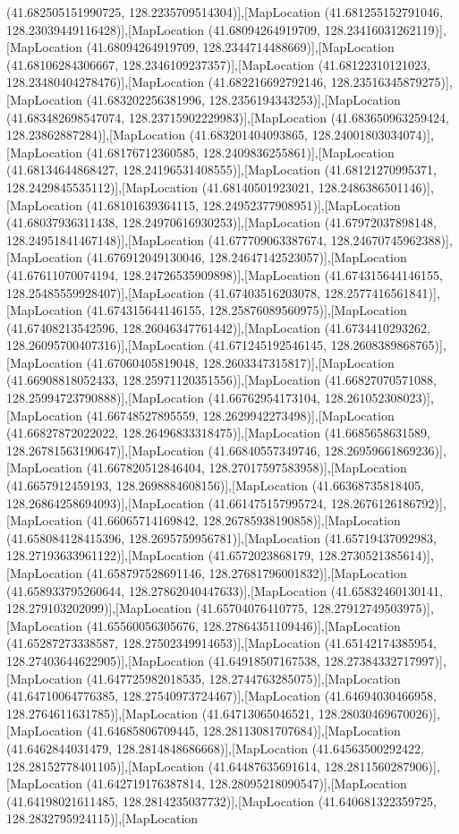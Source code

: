 (41.682505151990725, 128.2235709514304)],[MapLocation (41.681255152791046, 128.23039449116428)],[MapLocation (41.68094264919709, 128.23416031262119)],[MapLocation (41.68094264919709, 128.2344714488669)],[MapLocation (41.68106284306667, 128.2346109237357)],[MapLocation (41.68122310121023, 128.23480404278476)],[MapLocation (41.682216692792146, 128.23516345879275)],[MapLocation (41.683202256381996, 128.2356194343253)],[MapLocation (41.683482698547074, 128.23715902229983)],[MapLocation (41.683650963259424, 128.23862887284)],[MapLocation (41.683201404093865, 128.24001803034074)],[MapLocation (41.68176712360585, 128.2409836255861)],[MapLocation (41.68134644868427, 128.24196531408555)],[MapLocation (41.68121270995371, 128.2429845535112)],[MapLocation (41.68140501923021, 128.2486386501146)],[MapLocation (41.68101639364115, 128.24952377908951)],[MapLocation (41.68037936311438, 128.24970616930253)],[MapLocation (41.67972037898148, 128.24951841467148)],[MapLocation (41.677709063387674, 128.24670745962388)],[MapLocation (41.676912049130046, 128.24647142523057)],[MapLocation (41.67611070074194, 128.24726535909898)],[MapLocation (41.674315644146155, 128.25485559928407)],[MapLocation (41.67403516203078, 128.2577416561841)],[MapLocation (41.674315644146155, 128.25876089560975)],[MapLocation (41.67408213542596, 128.26046347761442)],[MapLocation (41.6734410293262, 128.26095700407316)],[MapLocation (41.671245192546145, 128.2608389868765)],[MapLocation (41.67060405819048, 128.2603347315817)],[MapLocation (41.66908818052433, 128.25971120351556)],[MapLocation (41.66827070571088, 128.25994723790888)],[MapLocation (41.66762954173104, 128.261052308023)],[MapLocation (41.66748527895559, 128.2629942273498)],[MapLocation (41.66827872022022, 128.26496833318475)],[MapLocation (41.6685658631589, 128.26781563190647)],[MapLocation (41.66840557349746, 128.26959661869236)],[MapLocation (41.667820512846404, 128.27017597583958)],[MapLocation (41.6657912459193, 128.2698884608156)],[MapLocation (41.66368735818405, 128.26864258694093)],[MapLocation (41.661475157995724, 128.2676126186792)],[MapLocation (41.66065714169842, 128.26785938190858)],[MapLocation (41.658084128415396, 128.2695759956781)],[MapLocation (41.65719437092983, 128.27193633961122)],[MapLocation (41.6572023868179, 128.2730521385614)],[MapLocation (41.658797528691146, 128.27681796001832)],[MapLocation (41.658933795260644, 128.27862040447633)],[MapLocation (41.65832460130141, 128.279103202099)],[MapLocation (41.65704076410775, 128.27912749503975)],[MapLocation (41.65560056305676, 128.27864351109446)],[MapLocation (41.65287273338587, 128.27502349914653)],[MapLocation (41.65142174385954, 128.27403644622905)],[MapLocation (41.64918507167538, 128.27384332717997)],[MapLocation (41.647725982018535, 128.2744763285075)],[MapLocation (41.64710064776385, 128.27540973724467)],[MapLocation (41.64694030466958, 128.2764611631785)],[MapLocation (41.64713065046521, 128.28030469670026)],[MapLocation (41.64685806709445, 128.28113081707684)],[MapLocation (41.6462844031479, 128.2814848686668)],[MapLocation (41.64563500292422, 128.28152778401105)],[MapLocation (41.64487635691614, 128.2811560287906)],[MapLocation (41.642719176387814, 128.28095218090547)],[MapLocation (41.64198021611485, 128.2814235037732)],[MapLocation (41.640681322359725, 128.2832795924115)],[MapLocation 